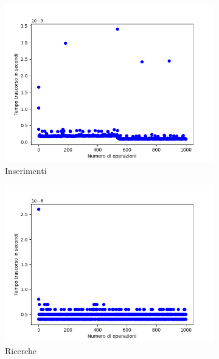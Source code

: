 \documentclass{article}
\begin{document}
			\begin{figure}[h]
				\centering
				
				\begin{subfigure}{0.49\textwidth}
					\centering
					\includegraphics[width = \textwidth]{HDM_Insertions}
					\caption{Inserimenti}
				\end{subfigure}
				\begin{subfigure}{0.49\textwidth}
					\centering
					\includegraphics[width = \textwidth]{HDM_Searches}
					\caption{Ricerche}
				\end{subfigure}
				\begin{subfigure}{0.49\textwidth}
					\centering

\end{subfigure}
\end{figure}
\end{document}
